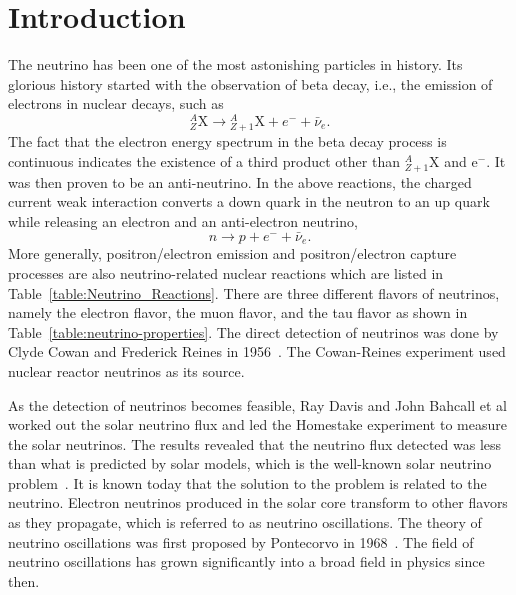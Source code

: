 \chapter{Introduction}
\label{introduction}

The neutrino has been one of the most astonishing particles in history. Its glorious history started with the observation of beta decay, i.e., the emission of electrons in nuclear decays, such as
\begin{equation*}
{}^A_Z \mathrm X \to {}_{Z+1}^A\mathrm X + e^- +\bar \nu_e .
\end{equation*}
The fact that the electron energy spectrum in the beta decay process is continuous indicates the existence of a third product other than ${}^{A}_{Z+1}\mathrm X$ and $\mathrm e^-$. It was then proven to be an anti-neutrino. In the above reactions, the charged current weak interaction converts a down quark in the neutron to an up quark while releasing an electron and an anti-electron neutrino,
\begin{equation}
n\to p + e^- + \bar \nu_e .
\end{equation}
More generally, positron/electron emission and positron/electron capture processes are also neutrino-related nuclear reactions which are listed in Table~\ref{table:Neutrino_Reactions}. There are three different flavors of neutrinos, namely the electron flavor, the muon flavor, and the tau flavor as shown in Table~\ref{table:neutrino-properties}. The direct detection of neutrinos was done by Clyde Cowan and Frederick Reines in 1956~\cite{Cowan1956}. The Cowan-Reines experiment used nuclear reactor neutrinos as its source.

As the detection of neutrinos becomes feasible, Ray Davis and John Bahcall et al worked out the solar neutrino flux and led the Homestake experiment to measure the solar neutrinos. The results revealed that the neutrino flux detected was less than what is predicted by solar models, which is the well-known solar neutrino problem~\cite{Bahcall1973}. It is known today that the solution to the problem is related to the neutrino. Electron neutrinos produced in the solar core transform to other flavors as they propagate, which is referred to as neutrino oscillations. The theory of neutrino oscillations was first proposed by Pontecorvo in 1968~\cite{Pontecorvo1968}. The field of neutrino oscillations has grown significantly into a broad field in physics since then.

